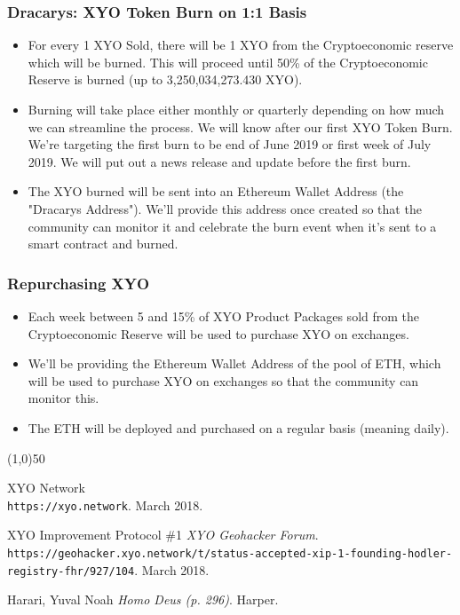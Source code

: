 \documentclass{article}
\begin{document}
\subsubsection{Dracarys: XYO Token Burn on 1:1 Basis}

\begin{itemize}
	\item For every 1 XYO Sold, there will be 1 XYO from the Cryptoeconomic reserve which will be burned. This will proceed until 50\% of the Cryptoeconomic Reserve is burned (up to 3,250,034,273.430 XYO).
	\item Burning will take place either monthly or quarterly depending on how much we can streamline the process. We will know after our first XYO Token Burn. We're targeting the first burn to be end of June 2019 or first week of July 2019. We will put out a news release and update before the first burn.
	\item The XYO burned will be sent into an Ethereum Wallet Address (the "Dracarys Address"). We'll provide this address once created so that the community can monitor it and celebrate the burn event when it's sent to a smart contract and burned.
\end{itemize}  

\subsubsection{Repurchasing XYO}
\begin{itemize}
	\item Each week between 5 and 15\% of XYO Product Packages sold from the Cryptoeconomic Reserve will be used to purchase XYO on exchanges.
	\item We'll be providing the Ethereum Wallet Address of the pool of ETH, which will be used to purchase XYO on exchanges so that the community can monitor this. 
	\item The ETH will be deployed and purchased on a regular basis (meaning daily).
\end{itemize}

\begin{center}
\line(1,0){50}
\end{center}

\begin{thebibliography}{9}

XYO Network
\\\texttt{https://xyo.network}.
March 2018.

XYO Improvement Protocol \#1
\textit{XYO Geohacker Forum}.
\\\texttt{https://geohacker.xyo.network/t/status-accepted-xip-1-founding-hodler-registry-fhr/927/104}.
March 2018.

Harari, Yuval Noah
\textit{Homo Deus (p. 296)}. 
Harper.


\end{thebibliography}

\end{document}
